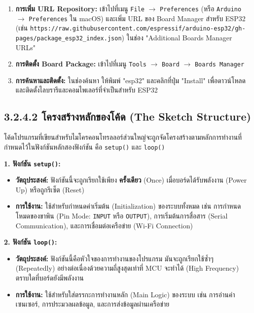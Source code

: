 \documentclass[11pt,a4paper,openany]{report}
\begin{document}
\begin{enumerate}
  \item \textbf{การเพิ่ม URL Repository:} เข้าไปที่เมนู \texttt{File} $\rightarrow$ \texttt{Preferences} (หรือ \texttt{Arduino} $\rightarrow$ \texttt{Preferences} ใน macOS) และเพิ่ม URL ของ Board Manager สำหรับ ESP32 (เช่น \texttt{https://raw.githubusercontent.com/espressif/arduino-esp32/gh-pages/package\_esp32\_index.json}) ในช่อง "Additional Boards Manager URLs"
  \item \textbf{การติดตั้ง Board Package:} เข้าไปที่เมนู \texttt{Tools} $\rightarrow$ \texttt{Board} $\rightarrow$ \texttt{Boards Manager}
  \item \textbf{การค้นหาและติดตั้ง:} ในช่องค้นหา ให้พิมพ์ "esp32" และคลิกที่ปุ่ม "Install" เพื่อดาวน์โหลดและติดตั้งไลบรารีและคอมไพเลอร์ที่จำเป็นสำหรับ ESP32
\end{enumerate}


\subsection{3.2.4.2 โครงสร้างหลักของโค้ด (The Sketch Structure)}


โค้ดโปรแกรมที่เขียนสำหรับไมโครคอนโทรลลอร์ส่วนใหญ่จะถูกจัดโครงสร้างตามหลักการทำงานที่กำหนดไว้ในฟังก์ชันหลักสองฟังก์ชัน คือ \texttt{setup()} และ \texttt{loop()}

\textbf{1. ฟังก์ชัน \texttt{setup()}:}
\begin{itemize}
  \item \textbf{วัตถุประสงค์:} ฟังก์ชันนี้จะถูกเรียกใช้เพียง \textbf{ครั้งเดียว} (Once) เมื่อบอร์ดได้รับพลังงาน (Power Up) หรือถูกรีเซ็ต (Reset)
  \item \textbf{การใช้งาน:} ใช้สำหรับกำหนดค่าเริ่มต้น (Initialization) ของระบบทั้งหมด เช่น การกำหนดโหมดของขาพิน (Pin Mode: \texttt{INPUT} หรือ \texttt{OUTPUT}), การเริ่มต้นการสื่อสาร (Serial Communication), และการเชื่อมต่อเครือข่าย (Wi-Fi Connection)
\end{itemize}


\textbf{2. ฟังก์ชัน \texttt{loop()}:}
\begin{itemize}
  \item \textbf{วัตถุประสงค์:} ฟังก์ชันนี้คือหัวใจของการทำงานของโปรแกรม มันจะถูกเรียกใช้ซ้ำๆ (Repeatedly) อย่างต่อเนื่องด้วยความถี่สูงสุดเท่าที่ MCU จะทำได้ (High Frequency) ตราบใดที่บอร์ดยังมีพลังงาน
  \item \textbf{การใช้งาน:} ใช้สำหรับใส่ตรรกะการทำงานหลัก (Main Logic) ของระบบ เช่น การอ่านค่าเซนเซอร์, การประมวลผลข้อมูล, และการส่งข้อมูลผ่านเครือข่าย
\end{itemize}
\end{document}
